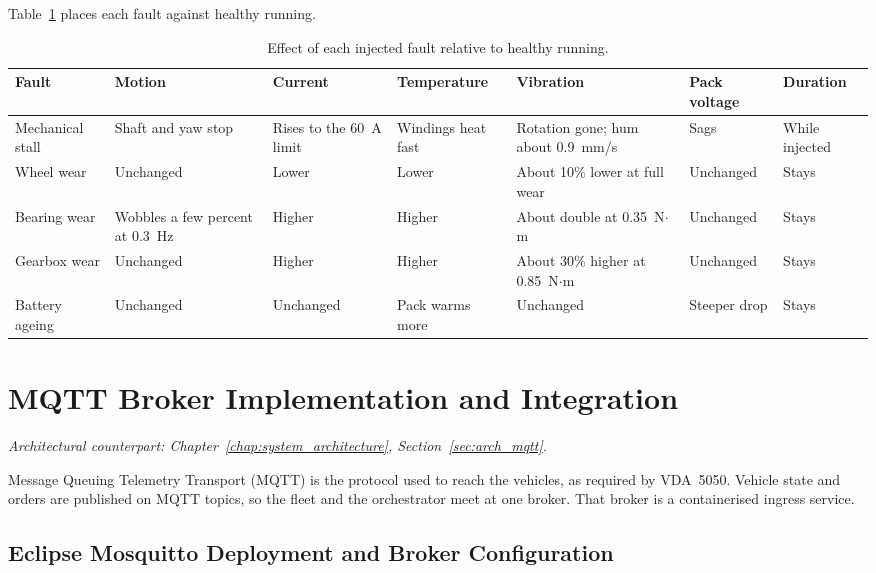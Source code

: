 Table~\ref{tab:fault-effects} places each fault against healthy running.

\begin{table}[H]
  \centering
  \footnotesize
  \caption{Effect of each injected fault relative to healthy running.}
  \label{tab:fault-effects}
  \begin{tabularx}{\linewidth}{@{}
    >{\raggedright\arraybackslash}p{2.15cm}
    >{\raggedright\arraybackslash}X
    >{\raggedright\arraybackslash}X
    >{\raggedright\arraybackslash}X
    >{\raggedright\arraybackslash}X
    >{\raggedright\arraybackslash}X
    >{\raggedright\arraybackslash}p{1.7cm}
    @{}}
    \toprule
    \textbf{Fault} & \textbf{Motion} & \textbf{Current} & \textbf{Temperature} & \textbf{Vibration} & \textbf{Pack voltage} & \textbf{Duration} \\
    \midrule
    Mechanical stall & Shaft and yaw stop & Rises to the 60~A limit & Windings heat fast & Rotation gone; hum about 0.9~mm/s & Sags & While injected \\
    Wheel wear & Unchanged & Lower & Lower & About 10\% lower at full wear & Unchanged & Stays \\
    Bearing wear & Wobbles a few percent at 0.3~Hz & Higher & Higher & About double at 0.35~N$\cdot$m & Unchanged & Stays \\
    Gearbox wear & Unchanged & Higher & Higher & About 30\% higher at 0.85~N$\cdot$m & Unchanged & Stays \\
    Battery ageing & Unchanged & Unchanged & Pack warms more & Unchanged & Steeper drop & Stays \\
    \bottomrule
  \end{tabularx}
\end{table}

\section{MQTT Broker Implementation and Integration} 
\label{sec:mqtt_broker_implementation}
\textit{Architectural counterpart: Chapter~\ref{chap:system_architecture}, Section~\ref{sec:arch_mqtt}.}

Message Queuing Telemetry Transport (MQTT) is the protocol used to reach the vehicles, as required by VDA~5050. Vehicle state and orders are published on MQTT topics, so the fleet and the orchestrator meet at one broker. That broker is a containerised ingress service.

\subsection{Eclipse Mosquitto Deployment and Broker Configuration}
\label{subsec:mosquitto_implementation}

